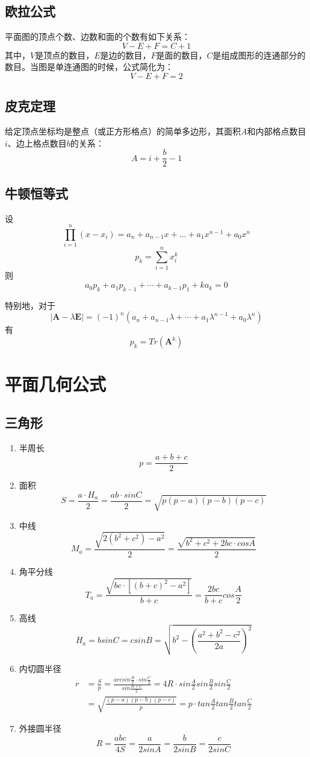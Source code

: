 	\subsection{欧拉公式}
		平面图的顶点个数、边数和面的个数有如下关系：
			$$V - E + F = C+ 1$$
		\indent 其中，$V$是顶点的数目，$E$是边的数目，$F$是面的数目，$C$是组成图形的连通部分的数目。当图是单连通图的时候，公式简化为：
			$$V - E + F = 2$$
	\subsection{皮克定理}
		给定顶点坐标均是整点（或正方形格点）的简单多边形，其面积$A$和内部格点数目$i$、边上格点数目$b$的关系：
			$$A = i + \frac{b}{2} - 1$$
	\subsection{牛顿恒等式}
		设$$\prod_{i = 1}^n{(x - x_i)} = a_n + a_{n - 1} x + \dots + a_1 x^{n - 1} + a_0 x^n$$
		$$p_k = \sum_{i = 1}^n{x_i^k}$$
		则$$a_0 p_k + a_1 p_{k - 1} + \cdots + a_{k - 1} p_1 + k a_k = 0$$\par
		特别地，对于$$|\bm{A} - \lambda \bm{E}| = (-1)^n(a_n + a_{n - 1} \lambda + \cdots + a_1 \lambda^{n - 1} + a_0 \lambda^n)$$
		有$$p_k = Tr(\bm{A}^k)$$
\section{平面几何公式}
	\subsection{三角形}
		\begin{enumerate}
			\item 半周长
				$$p=\frac{a+b+c}{2}$$
			\item 面积
				$$S=\frac{a \cdot H_a}{2}=\frac{ab \cdot sinC}{2}=\sqrt{p(p-a)(p-b)(p-c)}$$
			\item 中线
				$$M_a=\frac{\sqrt{2(b^2+c^2)-a^2}}{2}=\frac{\sqrt{b^2+c^2+2bc \cdot cosA}}{2}$$
			\item 角平分线 
				$$T_a=\frac{\sqrt{bc \cdot [(b+c)^2-a^2]}}{b+c}=\frac{2bc}{b+c}cos\frac{A}{2}$$
			\item 高线
				$$H_a=bsinC=csinB=\sqrt{b^2-(\frac{a^2+b^2-c^2}{2a})^2}$$
			\item 内切圆半径
				\begin{align*}
					r&=\frac{S}{p}=\frac{arcsin\frac{B}{2} \cdot sin\frac{C}{2}}{sin\frac{B+C}{2}}=4R \cdot sin\frac{A}{2}sin\frac{B}{2}sin\frac{C}{2}\\
					&=\sqrt{\frac{(p-a)(p-b)(p-c)}{p}}=p \cdot tan\frac{A}{2}tan\frac{B}{2}tan\frac{C}{2}
				\end{align*}
			\item 外接圆半径
				$$R=\frac{abc}{4S}=\frac{a}{2sinA}=\frac{b}{2sinB}=\frac{c}{2sinC}$$
		\end{enumerate}
